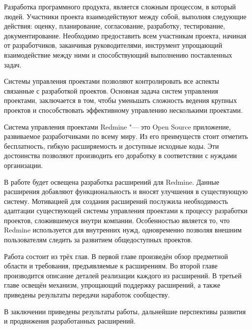 Разработка программного продукта, является сложным процессом, в который
 людей. Участники проекта взаимодействуют между собой,
выполняя следующие действия: оценку, планирование, согласование, разработку,
тестирование, документирование. 
Необходимо предоставить всем участникам
проекта, начиная от разработчиков, заканчивая руководителями, инструмент
упрощающий взаимодействие между ними и способствующий выполнению поставленных
задач.

Системы управления проектами позволяют контролировать все аспекты связанные с
разработкой проектов. Основная задача систем управления проектами, заключается в
том, чтобы уменьшать сложность ведения крупных проектов и способствовать
эффективному управлению несколькими проектами.

Система управления проектами Redmine "--- это Open Source приложение,
развиваемое разработчиками по всему миру. Из его преимуществ стоит
отметить бесплатность, гибкую расширяемость и доступные исходные коды. Эти
достоинства позволяют производить его доработку в соответствии с нуждами
организации.

В работе будет освещена разработка расширений для Redmine. Данные
расширения добавляют функциональность и вносят улучшения в существующую
систему. Мотивацией для создания расширений послужила необходимость адаптации
существующей системы управления проектами к процессу разработки проектов,
сложившемуся внутри компании.  Особенностью является то, что Redmine используется для
внутренних нужд, одновременно позволяя внешним пользователям следить за
развитием общедоступных проектов. 

Работа состоит из трёх глав. В первой главе произведён обзор предметной области
и требования, предъявляемые к расширениям. Во второй главе производится
описание деталей реализации каждого из расширений. В третьей главе освещён
механизм, упрощающий поддержку расширений, а также приведены результаты
передачи наработок сообществу.

В заключении приведены результаты работы, дальнейшие перспективы развития и
продвижения разработанных расширений.

